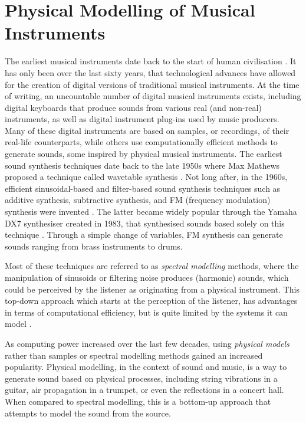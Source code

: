 \chapter{Physical Modelling of Musical Instruments}\label{ch:physMod}
 The earliest musical instruments date back to the start of human civilisation \cite{Fletcher1998}. It has only been over the last sixty years, that technological advances have allowed for the creation of digital versions of traditional musical instruments. At the time of writing, an uncountable number of digital musical instruments exists, including digital keyboards that produce sounds from various real (and non-real) instruments, as well as digital instrument plug-ins used by music producers. Many of these digital instruments are based on samples, or recordings, of their real-life counterparts, while others use computationally efficient methods to generate sounds, some inspired by physical musical instruments. The earliest sound synthesis techniques date back to the late 1950s where Max Mathews proposed a technique called wavetable synthesis \cite{Puckette2002}. Not long after, in the 1960s, efficient sinusoidal-based and filter-based sound synthesis techniques such as additive synthesis, subtractive synthesis, and FM (frequency modulation) synthesis were invented \cite{Roads1996, Chowning1973}. The latter became widely popular through the Yamaha DX7 synthesiser created in 1983, that synthesised sounds based solely on this technique \cite{DX7}. Through a simple change of variables, FM synthesis can generate sounds ranging from brass instruments to drums. 

Most of these techniques are referred to as \textit{spectral modelling} methods, where the manipulation of sinusoids or filtering noise produces (harmonic) sounds, which could be perceived by the listener as originating from a physical instrument. This top-down approach which starts at the perception of the listener, has advantages in terms of computational efficiency, but is quite limited by the systems it can model \cite{Smith2010a}. 

As computing power increased over the last few decades, using \textit{physical models} rather than samples or spectral modelling methods gained an increased popularity.
Physical modelling, in the context of sound and music, is a way to generate sound based on physical processes, including string vibrations in a guitar, air propagation in a trumpet, or even the reflections in a concert hall. When compared to spectral modelling, this is a bottom-up approach that attempts to model the sound from the source.  

